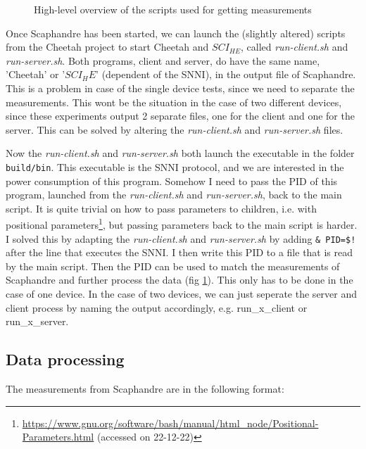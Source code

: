 \documentclass[../thesis.tex]{subfiles}
\begin{document}
\begin{figure}[t]
    \centering
       
    \caption{High-level overview of the scripts used for getting measurements}
    \label{fig:scripts}
\end{figure}

Once Scaphandre has been started, we can launch the (slightly altered) scripts from the Cheetah project to start Cheetah and $SCI_{HE}$, called \textit{run-client.sh} and \textit{run-server.sh}. Both programs, client and server, do have the same name, 'Cheetah' or '$SCI_HE$' (dependent of the SNNI), in the output file of Scaphandre. This is a problem in case of the single device tests, since we need to separate the measurements. This wont be the situation in the case of two different devices, since these experiments output 2 separate files, one for the client and one for the server. This can be solved by altering the \textit{run-client.sh} and \textit{run-server.sh} files.

Now the \textit{run-client.sh} and \textit{run-server.sh} both launch the executable in the folder \verb|build/bin|. This executable is the SNNI protocol, and we are interested in the power consumption of this program. Somehow I need to pass the PID of this program, launched from the \textit{run-client.sh} and \textit{run-server.sh}, back to the main script. It is quite trivial on how to pass parameters to children, i.e. with positional parameters\footnote{\url{https://www.gnu.org/software/bash/manual/html_node/Positional-Parameters.html} (accessed on 22-12-22)}, but passing parameters back to the main script is harder. I solved this by adapting the \textit{run-client.sh} and \textit{run-server.sh} by adding \verb|& PID=$!| after the line that executes the SNNI. I then write this PID to a file that is read by the main script. Then the PID can be used to match the measurements of Scaphandre and further process the data (fig \ref{fig:scripts}). This only has to be done in the case of one device. In the case of two devices, we can just seperate the server and client process by naming the output accordingly, e.g. run\_x\_client or run\_x\_server. 

\subsection{Data processing}
The measurements from Scaphandre are in the following format:
\end{document}
